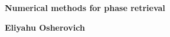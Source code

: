 \thispagestyle{empty}

\begin{center}
  \vspace*{0.25\textheight{}}
  \Huge {
    \textbf{Numerical methods for phase retrieval}
  }

  
  \vspace*{0.3\textheight{}}
  \LARGE{\textbf{Eliyahu Osherovich}}
\end{center}
\newpage
\thispagestyle{empty}
\mbox{}
